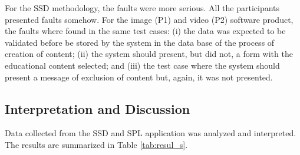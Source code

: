 \begin{itemize}
For the SSD methodology, the faults were more serious. All the participants presented faults somehow. For the image (P1) and video (P2) software product, the faults where found in the same test cases: (i) the data was expected to be validated before be stored by the system in the data base of the process of creation of content; (ii) the system should present, but did not, a form with the educational content selected; and (iii) the  test case where the system should present a message of exclusion of content but, again, it was not presented. 

\end{itemize}

\subsection{Interpretation and Discussion}\label{sub:interpretation}

Data collected from the SSD and SPL application was analyzed and interpreted. The results are summarized in Table \ref{tab:resul_s}.

